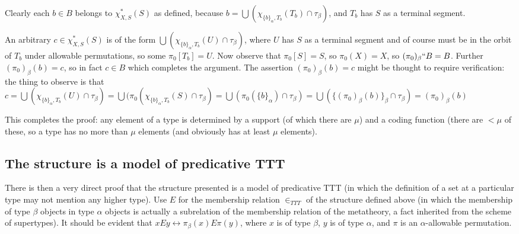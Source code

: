 \documentclass[112pt]{article}
\begin{document}
\begin{description}
Clearly each $b \in B$ belongs to $\chi^*_{X,S}(S)$ as defined, because \newline $b = \bigcup (\chi_{\{b\}_\alpha,T_b}(T_b)\cap \tau_{\beta})$, and $T_b$ has $S$ as a terminal segment.

An arbitrary $c \in \chi_{X,S}^*(S)$ is of the form $\bigcup (\chi_{\{b\}_\alpha,T_b}(U)\cap \tau_{\beta})$, where $U$ has $S$ as a terminal segment and of course must be in the orbit of $T_b$ under allowable permutations, so some $\pi_0[T_b] = U$. Now observe that $\pi_0[S]=S$, so $\pi_0(X)=X$, so
$(\pi_0)_\beta``B=B$.  Further $(\pi_0)_\beta(b) = c$, so in fact $c \in B$ which completes the argument.  The assertion $(\pi_0)_\beta(b) = c$ might be thought to require verification:   the thing to observe is that $c=\bigcup (\chi_{\{b\}_\alpha,T_b}(U) \cap \tau_\beta)=\bigcup(\pi_0(\chi_{\{b\}_\alpha,T_b}(S)\cap \tau_\beta)=
\bigcup (\pi_0(\{b\}_\alpha)\cap \tau_\beta) =\bigcup(\{(\pi_0)_\beta(b)\}_\beta \cap \tau_\beta) = (\pi_0)_\beta(b)$


\end{description}

This completes the proof:  any element of a type is determined by a support (of which there are $\mu$) and a coding function (there are $<\mu$ of these, so a type has no more than $\mu$ elements (and obviously has at least $\mu$ elements).

\newpage
\subsection{The structure is a model of predicative TTT}

There is then a very direct proof that the structure presented is a model of predicative TTT (in which the definition of a set at a particular type may not mention any higher type).  Use $E$ for the membership relation $\in_{TTT}$ of the structure defined above (in which the membership of type $\beta$ objects in type $\alpha$ objects is actually a subrelation of the membership relation of the metatheory, a fact inherited from the scheme of supertypes).  It should be evident that $x E y \leftrightarrow \pi_\beta(x) E \pi(y)$,
where $x$ is of type $\beta$, $y$ is of type $\alpha$, and $\pi$ is an $\alpha$-allowable permutation.
\end{document}
